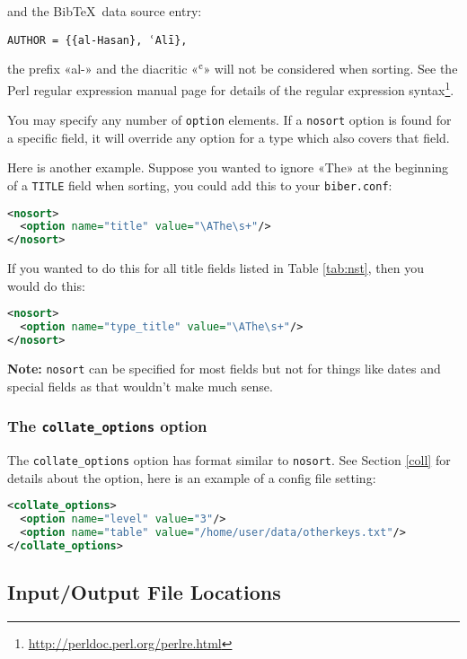 \documentclass{ltxdockit}
\begin{document}
\noindent and the Bib\TeX\ data source entry:

\begin{verbatim}
AUTHOR = {{al-Hasan}, ʿAlī},
\end{verbatim}

\noindent the prefix «al-» and the diacritic «ʿ» will not be considered
when sorting. See the Perl regular expression manual page for
details of the regular expression syntax\footnote{\url{http://perldoc.perl.org/perlre.html}}.

You may specify any number of \verb+option+ elements. If a
\verb+nosort+ option is found for a specific field, it will override
any option for a type which also covers that field.

Here is another example. Suppose you wanted to ignore «The» at the
beginning of a \verb+TITLE+ field when sorting, you could add this to your
\verb+biber.conf+:

\begin{lstlisting}[language=xml]
<nosort>
  <option name="title" value="\AThe\s+"/>
</nosort>
\end{lstlisting}

\noindent If you wanted to do this for all title fields listed in Table
\ref{tab:nst}, then you would do this:

\begin{lstlisting}[language=xml]
<nosort>
  <option name="type_title" value="\AThe\s+"/>
</nosort>
\end{lstlisting}

\noindent \textbf{Note:} \verb+nosort+ can be specified for most fields but
not for things like dates and special fields as that wouldn't make much sense.
\bigskip
\subsubsection{The \texttt{collate\_options} option}

The \verb+collate_options+ option has format similar to
\verb+nosort+. See Section \ref{coll} for details about the option,
here is an example of a config file setting:

\begin{lstlisting}[language=xml]
<collate_options>
  <option name="level" value="3"/>
  <option name="table" value="/home/user/data/otherkeys.txt"/>
</collate_options>
\end{lstlisting}
\bigskip
\subsection{Input/Output File Locations}
\end{document}
